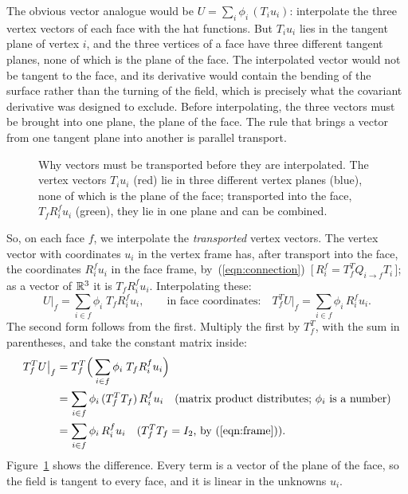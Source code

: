 The obvious vector analogue would be $U = \sum_i \phi_i\, (T_i u_i)$: interpolate the three vertex vectors of each face with the hat functions. But $T_i u_i$ lies in the tangent plane of vertex $i$, and the three vertices of a face have three different tangent planes, none of which is the plane of the face. The interpolated vector would not be tangent to the face, and its derivative would contain the bending of the surface rather than the turning of the field, which is precisely what the covariant derivative was designed to exclude. Before interpolating, the three vectors must be brought into one plane, the plane of the face. The rule that brings a vector from one tangent plane into another is parallel transport.
\begin{figure}[t]
\centering
{}
\caption{Why vectors must be transported before they are interpolated. The vertex vectors $T_i u_i$ (red) lie in three different vertex planes (blue), none of which is the plane of the face; transported into the face, $T_f R_i^f u_i$ (green), they lie in one plane and can be combined.}
\label{fig:naive}
\end{figure}
So, on each face $f$, we interpolate the \emph{transported} vertex vectors. The vertex vector with coordinates $u_i$ in the vertex frame has, after transport into the face, the coordinates $R_i^f u_i$ in the face frame, by~(\ref{eqn:connection})~[\,$R_i^f = T_f^TQ_{i\to f}T_i$\,]; as a vector of $\mathbb{R}^3$ it is $T_f R_i^f u_i$. Interpolating these:
\begin{equation}
\label{eqn:trial}
U\big|_f = \sum_{i \in f} \phi_i\; T_f R_i^f u_i, \qquad \text{in face coordinates:} \quad T_f^T U\big|_f = \sum_{i \in f} \phi_i\, R_i^f u_i .
\end{equation}
The second form follows from the first. Multiply the first by $T_f^T$, with the sum in parentheses, and take the constant matrix inside:
\begin{align*}
T_f^T U\big|_f &= T_f^T \Big( \sum_{i\in f} \phi_i\; T_f R_i^f u_i \Big) \\
&= \sum_{i\in f} \phi_i\, (T_f^T T_f)\, R_i^f u_i \quad \text{(matrix product distributes; $\phi_i$ is a number)}\\
&= \sum_{i\in f} \phi_i\, R_i^f u_i \quad \text{($T_f^T T_f = I_2$, by~(\ref{eqn:frame}))}.
\end{align*}
Figure~\ref{fig:naive} shows the difference. Every term is a vector of the plane of the face, so the field is tangent to every face, and it is linear in the unknowns $u_i$.

